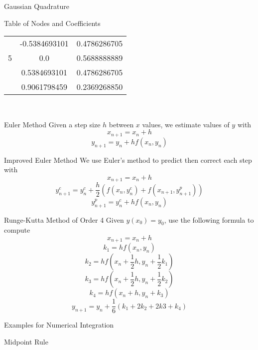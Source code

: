 \documentclass{article}
\begin{document}
\begin{multicols*}{3}
\begin{blackbox}{Gaussian Quadrature}
\begin{redbox}{Table of Nodes and Coefficients}
\begin{center}
\begin{tabular}{c|cc}
                    &-0.5384693101& 0.4786286705\\
                    5 &0.0 &0.5688888889\\
                    &0.5384693101 &0.4786286705\\
                    &0.9061798459& 0.2369268850\\
                \end{tabular}
            \end{center}
        \end{redbox}\\[-2ex]
    \end{blackbox}
    \begin{blackbox}{Euler Method}
        Given a step size $h$ between $x$ values, we estimate values of $y$ with \\[-5ex]
        \[x_{n+1} = x_n + h\]
        \[y_{n+1} = y_n + hf(x_n, y_n)\]
        \vspace{-4ex}
    \end{blackbox}
    \begin{blackbox}{Improved Euler Method}
        We use Euler's method to predict then correct each step with \\[-5ex]
        \[x_{n+1} = x_n + h\]
        \[y^c_{n+1} = y_n^c + \frac{h}{2}(f(x_n, y_n^c) + f(x_{n+1},y^p_{n+1}))\]
        \[y^p_{n+1} = y_n^c + hf(x_n, y_n)\]
        \vspace{-4ex}
    \end{blackbox}
    \begin{blackbox}{Runge-Kutta Method of Order 4}
        Given $y(x_0) = y_0$, use the following formula to compute \\[-2ex]
        {\footnotesize
        \[x_{n+1} = x_n + h\]
        \[k_1 = hf(x_n,y_n)\]
        \[k_2 = hf\left(x_n + \frac{1}{2}h, y_n + \frac{1}{2}k_1\right)\]
        \[k_3 = hf\left(x_n + \frac{1}{2}h, y_n + \frac{1}{2}k_2\right)\]
        \[k_4 = hf\left(x_n + h, y_n + k_3\right)\]
        \[y_{n+1} = y_n + \frac{1}{6}(k_1 + 2k_2 + 2k3 + k_4)\]
        }
        \vspace{-4ex}
    \end{blackbox}
    \begin{blackbox}{Examples for Numerical Integration}
        \begin{bluebox}{Midpoint Rule}
            

\end{bluebox}
\end{blackbox}
\end{multicols*}
\end{document}
